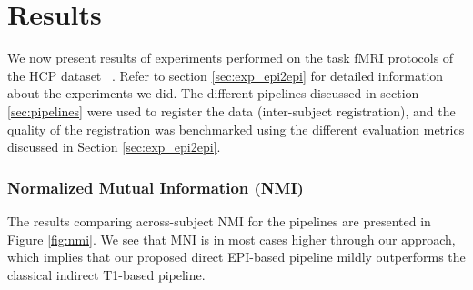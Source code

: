 \section{Results}
\label{sec:results}
We now present results of experiments performed on the task fMRI
protocols of the HCP dataset ~\citep{VanEssen20122222}. Refer to
section \ref{sec:exp_epi2epi} for detailed information about the
experiments we did. The different pipelines discussed in section
\ref{sec:pipelines} were used to register the data (inter-subject
registration), and the quality of the registration was benchmarked
using the different evaluation metrics discussed in Section \ref{sec:exp_epi2epi}. 

\subsubsection{Normalized Mutual Information (NMI)}
The results comparing across-subject NMI for the pipelines are presented in Figure \ref{fig:nmi}. We see that MNI is in most cases higher through our approach, which implies that 
our proposed direct EPI-based pipeline mildly outperforms the classical indirect T1-based pipeline.

